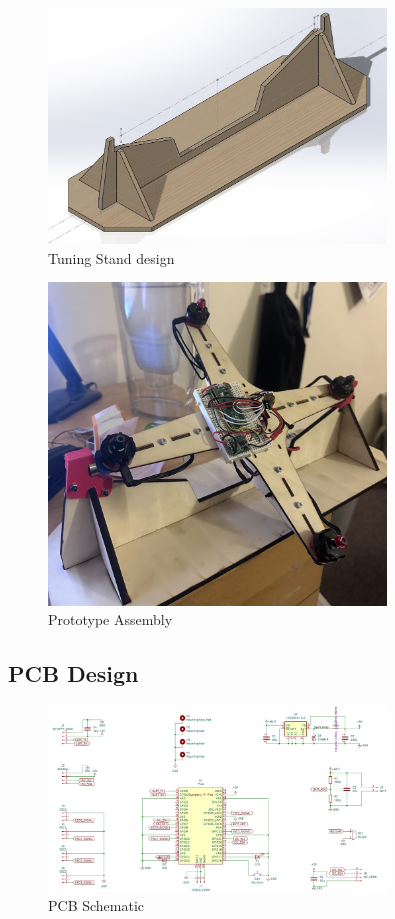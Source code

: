 \documentclass{article}
\begin{document}
\begin{figure}[H]
    \centering
    \includegraphics[width=0.8\textwidth]{tuning_stand.jpg}
    \caption{Tuning Stand design}
\end{figure}

\begin{figure}[H]
    \centering
    \includegraphics[width=0.8\textwidth]{development.jpg}
    \caption{Prototype Assembly}
\end{figure}

\subsection{PCB Design}

\begin{figure}[H]
    \centering
    \includegraphics[width=0.8\textwidth]{schematic.jpg}
    \caption{PCB Schematic}
\end{figure}
\end{document}
